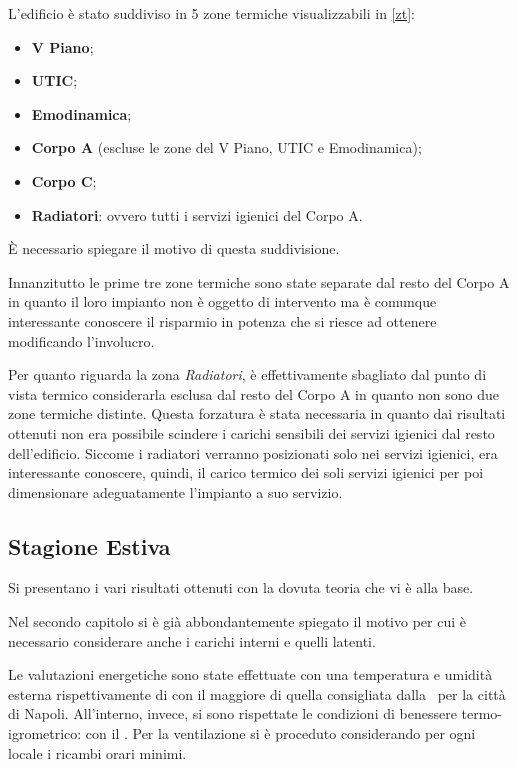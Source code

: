 L'edificio è stato suddiviso in 5 zone termiche visualizzabili in \vref{zt}:
\begin{itemize}
	\item \textbf{V Piano};
	\item \textbf{UTIC};
	\item \textbf{Emodinamica};
	\item \textbf{Corpo A} (escluse le zone del V Piano, UTIC e Emodinamica);
	\item \textbf{Corpo C};
	\item \textbf{Radiatori}: ovvero tutti i servizi igienici del Corpo A. 
\end{itemize}
È necessario spiegare il motivo di questa suddivisione.

Innanzitutto le prime tre zone termiche sono state separate dal resto del Corpo A in quanto il loro impianto non è oggetto di intervento ma è comunque interessante conoscere il risparmio in potenza che si riesce ad ottenere modificando l'involucro.

Per quanto riguarda la zona \emph{Radiatori}, è effettivamente sbagliato dal punto di vista termico considerarla esclusa dal resto del Corpo A in quanto non sono due zone termiche distinte. Questa forzatura è stata necessaria in quanto dai risultati ottenuti non era possibile scindere i carichi sensibili dei servizi igienici dal resto dell'edificio. Siccome i radiatori verranno posizionati solo nei servizi igienici, era interessante conoscere, quindi, il carico termico dei soli servizi igienici per poi dimensionare adeguatamente l'impianto a suo servizio. 

\subsection{Stagione Estiva}
Si presentano i vari risultati ottenuti con la dovuta teoria che vi è alla base.

Nel secondo capitolo si è già abbondantemente spiegato il motivo per cui è necessario considerare anche i carichi interni e quelli latenti.

Le valutazioni energetiche sono state effettuate con una temperatura e umidità esterna rispettivamente di  con il  maggiore di quella consigliata dalla \norvent\ per la città di Napoli. All'interno, invece, si sono rispettate le condizioni di benessere termo-igrometrico:  con il . Per la ventilazione si è proceduto considerando per ogni locale i ricambi orari minimi.

